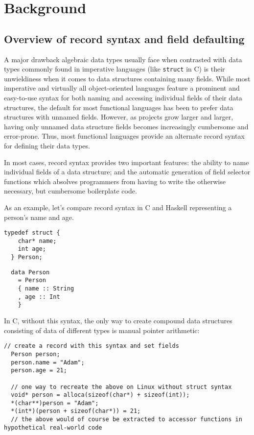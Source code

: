 \documentclass[en]{pracamgr}
\begin{document}
\chapter{Background}\label{r:bg}
\section{Overview of record syntax and field defaulting}
A major drawback algebraic data types usually face when contrasted with data types commonly found in imperative languages (like \texttt{struct} in C) is their unwieldiness when it comes to data structures containing many fields.
While most imperative and virtually all object-oriented languages feature a prominent and easy-to-use syntax for both naming and accessing individual fields of their data structures, the default for most functional languages has been to prefer data structures with unnamed fields.
However, as projects grow larger and larger, having only unnamed data structure fields becomes increasingly cumbersome and error-prone.
Thus, most functional languages provide an alternate record syntax for defining their data types. 

In most cases, record syntax provides two important features: 
the ability to name individual fields of a data structure; 
and the automatic generation of field selector functions which
absolves programmers from having to write the otherwise necessary,
but cumbersome boilerplate code.

As an example, let's compare record syntax in C and Haskell representing a person's name and age.

\begin{lstlisting}[style=c]
  typedef struct {
    char* name;
    int age;
  } Person;
\end{lstlisting}

\begin{lstlisting}
  data Person 
    = Person 
    { name :: String
    , age :: Int
    }
\end{lstlisting}
In C, without this syntax, the only way to create compound data structures consisting of data of different types is manual pointer arithmetic:
\begin{lstlisting}[style=c]
  // create a record with this syntax and set fields
  Person person;
  person.name = "Adam";
  person.age = 21;

  // one way to recreate the above on Linux without struct syntax
  void* person = alloca(sizeof(char*) + sizeof(int));
  *(char**)person = "Adam";
  *(int*)(person + sizeof(char*)) = 21;
  // the above would of course be extracted to accessor functions in hypothetical real-world code
\end{lstlisting}
\end{document}

